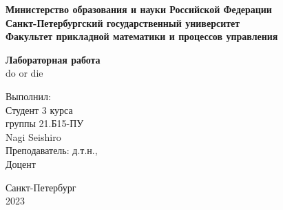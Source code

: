 \begin{titlepage}
    \newpage
    \begin{center}
    {\bfseries Министерство образования и науки Российской Федерации \\
    Санкт-Петербургский государственный университет\\
    Факультет прикладной математики и процессов управления}

    \vspace{5em}
    \end{center}
    \vspace{1.2em}

    \begin{center}
    \textbf{\Large Лабораторная работа}\\
    \Large{do or die}
    \end{center}
    \vspace{5em}

    \begin{flushright}
        \begin{minipage}{.3\textwidth}
            Выполнил:\\
            Студент 3 курса\\
            группы 21.Б15-ПУ\\
            Nagi Seishiro\\
            
            Преподаватель: д.т.н.,\\
            Доцент 
        \end{minipage}
    \end{flushright}

    \vspace{\fill}

    \begin{center}
    Санкт-Петербург\\ 2023
    \end{center}

    \end{titlepage}
